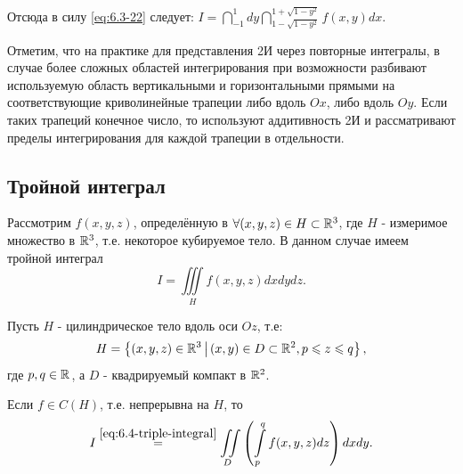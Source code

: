 \begin{example}
\begin{enumerate}
		Отсюда в силу \eqref{eq:6.3-22} следует: $I = \dint\limits_{-1}^1 dy \dint\limits_{1 - \sqrt{1 - y^2}}^{1 + \sqrt{1 - y^2}} f(x,y)dx$.
	\end{enumerate}
	Отметим, что на практике для представления 2И через повторные интегралы, в случае более сложных областей интегрирования
	при возможности разбивают используемую область вертикальными и горизонтальными прямыми на соответствующие криволинейные трапеции либо вдоль $ Ox $, либо вдоль $ Oy $.
	Если таких трапеций конечное число, то используют аддитивность 2И и рассматривают пределы интегрирования для каждой трапеции в отдельности.
\end{example}

\subsection{Тройной интеграл}
Рассмотрим $f(x, y, z)$, определённую в $\forall (x, y, z) \in H \subset \mathbb{R}^{3}$, где $H$ - измеримое
множество в $\mathbb{R}^{3}$, т.е. некоторое кубируемое тело. В данном случае имеем тройной интеграл
\begin{equation}
	\label{eq:6.4-triple-integral}
	I = \iiint\limits_H f(x, y, z)dxdydz.
\end{equation}

\begin{theorem}
    Пусть $H$ - цилиндрическое тело вдоль оси $Oz$, т.е:
    \begin{equation}
		\label{eq:6.4-symmetric-body}
		H = \left\{ (x, y, z) \in \mathbb{R}^{3} \, \middle\vert \, (x, y) \in D \subset \mathbb{R}^{2}, p \leqslant z \leqslant q \right\},
    \end{equation}
    где $p, q \in \mathbb{R}^{}$, а $D$ - квадрируемый компакт в $\mathbb{R}^{2}$.

    Если $f \in C(H)$, т.е. непрерывна на $H$, то
    \begin{equation}
		\label{eq:6.4-triple-to-double-integral}
		I \overset{\eqref{eq:6.4-triple-integral}}{=} \iint\limits_D
		\left( \int\limits_p^q f(x, y, z)dz \right)dxdy.
    \end{equation}
\end{theorem}

